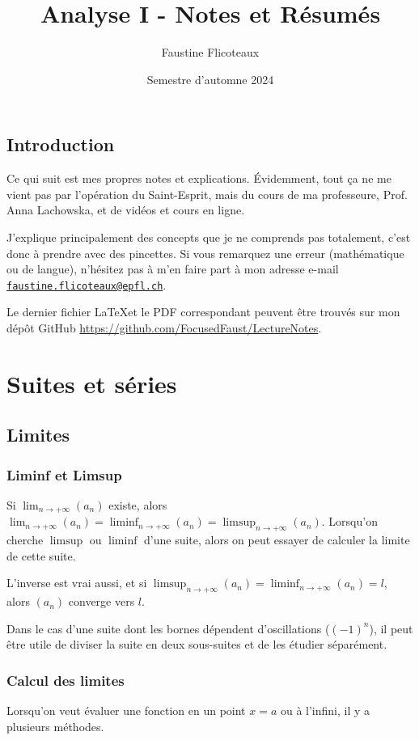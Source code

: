 \documentclass[10pt,a4paper]{book}
\title{Analyse I - Notes et Résumés}
\author{Faustine Flicoteaux}
\date{Semestre d'automne 2024}
\begin{document}
\maketitle
\tableofcontents
\newpage


\section*{Introduction}
Ce qui suit est mes propres notes et explications. Évidemment, tout ça ne me vient pas par l'opération du Saint-Esprit, mais du cours de ma professeure, Prof. Anna Lachowska, et de vidéos et cours en ligne.\par 
J'explique principalement des concepts que je ne comprends pas totalement, c'est donc à prendre avec des pincettes. Si vous remarquez une erreur (mathématique ou de langue), n'hésitez pas à m'en faire part à mon adresse e-mail \texttt{\href{mailto:faustine.flicoteaux@epfl.ch}{faustine.flicoteaux@epfl.ch}}.\par 
Le dernier fichier \LaTeX et le PDF correspondant peuvent être trouvés sur mon dépôt GitHub \url{https://github.com/FocusedFaust/LectureNotes}.

\chapter{Suites et séries}
\section{Limites}
\subsection{Liminf et Limsup}
Si $\lim_{n\to+\infty}(a_n)$ existe, alors  $\lim_{n\to+\infty}(a_n) = \liminf_{n\to+\infty}(a_n) = \limsup_{n\to+\infty}(a_n)$. Lorsqu'on cherche $\limsup$ ou $\liminf$ d'une suite, alors on peut essayer de calculer la limite de cette suite.\par 
L'inverse est vrai aussi, et si $\limsup_{n\to+\infty}(a_n) = \liminf_{n\to+\infty}(a_n) = l$, alors $(a_n)$ converge vers $l$.\par 
Dans le cas d'une suite dont les bornes dépendent d'oscillations ($(-1)^n$), il peut être utile de diviser la suite en deux sous-suites et de les étudier séparément.

\subsection{Calcul des limites}
Lorsqu'on veut évaluer une fonction en un point $x=a$ ou à l'infini, il y a plusieurs méthodes.
\end{document}
